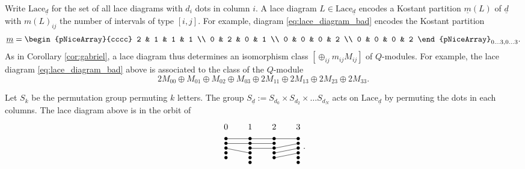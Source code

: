 \documentclass[a4paper]{amsart}
\newcommand{\um}{\underline{m}}
\newcommand{\ud}{\underline{d}}
\newcommand{\Sym}{S}  %
\newcommand{\Lace}{\mathrm{Lace}}
\theoremstyle{plain}
\begin{document}
Write $\Lace_{\ud}$ for the set of all lace diagrams with $d_i$ dots in column $i$. A lace diagram $L\in\Lace_{\ud}$ encodes a Kostant partition $\um(L)$ of $\ud$ with $m(L)_{ij}$ the number of intervals of type $[i,j]$. For example, diagram \eqref{eq:lace_diagram_bad} encodes the Kostant partition
\[
\um=
\begin{pNiceArray}{cccc}
    2 & 1 & 1 & 1 \\
    0 & 2 & 0 & 1 \\
    0 & 0 & 0 & 2 \\
    0 & 0 & 0 & 2
\end{pNiceArray}_{0\ldots 3, 0\ldots 3}.
\]
As in Corollary \ref{cor:gabriel}, a lace diagram thus determines an isomorphism class $[\oplus_{ij}m_{ij} M_{ij}]$ of $Q$-modules. For example, the lace diagram \eqref{eq:lace_diagram_bad} above is associated to the class of the $Q$-module
    \[
    2M_{00} \oplus M_{01} \oplus M_{02} \oplus M_{03} 
    \oplus 
    2M_{11} \oplus 2 M_{13} 
    \oplus 
    2 M_{23} 
    \oplus
    2M_{33}.
    \]
    
Let $\Sym_k$ be the permutation group permuting $k$ letters. The group $\Sym_{\ud}:=\Sym_{d_0}\times \Sym_{d_2}\times \ldots \Sym_{d_N}$ acts on $\Lace_{\ud}$ by permuting the dots in each columns. The lace diagram above is in the orbit of 
\begin{equation}
\label{eq:lace_diagram}
\begin{tikzpicture}[baseline=-12]
\node at (0,.5) {$0$};
\node at (1,.5) {$1$};
\node at (2,.5) {$2$};
\node at (3,.5) {$3$};
 \node at (0,0)  {$\bullet$};
 \node at (0,-.2)  {$\bullet$};
 \node at (0,-.4)  {$\bullet$};
 \node at (0,-.6)  {$\bullet$};
 \node at (0,-.8)  {$\bullet$};

 \node at (1,0)  {$\bullet$};
 \node at (1,-.2)  {$\bullet$};
 \node at (1,-.4)  {$\bullet$};
 \node at (1,-.6)  {$\bullet$};
 \node at (1,-.8)  {$\bullet$};
\node at (1,-1)  {$\bullet$};

 \node at (2,0)  {$\bullet$};
 \node at (2,-.2)  {$\bullet$};
 \node at (2,-.4)  {$\bullet$};
 \node at (2,-.6)  {$\bullet$};
 \node at (2,-.8)  {$\bullet$};

 \node at (3,0)  {$\bullet$};
 \node at (3,-.2)  {$\bullet$};
 \node at (3,-.4)  {$\bullet$};
 \node at (3,-.6)  {$\bullet$};
 \node at (3,-.8)  {$\bullet$};
 \node at (3,-1)  {$\bullet$};

\draw (0,0) -- (3,0);
\draw (0,-.2) -- (2,-.2);
\draw (1,-.4) -- (2,-.4) -- (3,-.2);
\draw (0,-.4) -- (1,-.6);
\draw (2,-.6) -- (3,-.4);
\draw (2,-.8) -- (3,-.6);
\end{tikzpicture}.
\end{equation}
\end{document}
